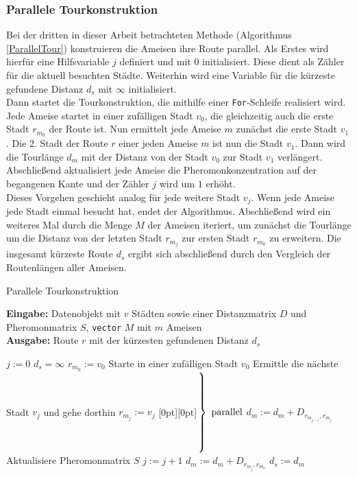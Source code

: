 \documentclass[doktyp=barbeit, sprache=german]{TUBAFarbeiten}
\begin{document}
\subsubsection{Parallele Tourkonstruktion}
Bei der dritten in dieser Arbeit betrachteten Methode (Algorithmus \ref{ParallelTour}) konstruieren die Ameisen ihre Route parallel.
Als Erstes wird hierfür eine Hilfsvariable $j$ definiert und mit $0$ initialisiert. Diese dient als Zähler für die aktuell besuchten Städte. Weiterhin wird eine Variable für die kürzeste gefundene Distanz $d_s$ mit $\infty$ initialisiert. \\Dann startet die Tourkonstruktion, die mithilfe einer \texttt{For}-Schleife realisiert wird. Jede Ameise startet in einer zufälligen Stadt $v_0$, die gleichzeitig auch die erste Stadt $r_{m_0}$ der Route ist. Nun ermittelt jede Ameise $m$ zunächst die erste Stadt $v_1$. Die 2. Stadt der Route $r$ einer jeden Ameise $m$ ist nun die Stadt $v_1$. Dann wird die Tourlänge $d_m$ mit der Distanz von der Stadt $v_0$ zur Stadt $v_1$ verlängert. Abschließend aktualisiert jede Ameise die Pheromonkonzentration auf der begangenen Kante und der Zähler $j$ wird um $1$ erhöht.
\\Dieses Vorgehen geschieht analog für jede weitere Stadt $v_j$. Wenn jede Ameise jede Stadt einmal besucht hat, endet der Algorithmus. Abschließend wird ein weiteres Mal durch die Menge $M$ der Ameisen iteriert, um zunächst die Tourlänge um die Distanz von der letzten Stadt $r_{m_j}$ zur ersten Stadt $r_{m_0}$ zu erweitern. Die insgesamt kürzeste Route $d_s$ ergibt sich abschließend durch den Vergleich der Routenlängen aller Ameisen.
\begin{algorithm}
\caption{Parallele Tourkonstruktion}
\label{ParallelTour}
\textbf{Eingabe:} Datenobjekt mit $v$ Städten sowie einer Distanzmatrix $D$ und Pheromonmatrix $S$, \texttt{vector} $M$ mit $m$ Ameisen
\\\textbf{Ausgabe:} Route $r$ mit der kürzesten gefundenen Distanz $d_s$
\begin{algorithmic}[1]
\State $j := 0$
\State $d_s = \infty$
\State $r_{m_0} := v_0$
\EndIf
\State Starte in einer zufälligen Stadt $v_0$
\State Ermittle die nächste Stadt $v_j$ und gehe dorthin
\State $r_{m_j} := v_j$
\hspace{17em}\raisebox{1.3\baselineskip}[0pt][0pt]{$\left.\rule{0pt}{3.8\baselineskip}\right\}\ \mbox{parallel}$}
\State $d_m := d_m + D_{r_{m_{j-1}},r_{m_j}}$
\State Aktualisiere Pheromonmatrix $S$
\EndFor
\State $j := j + 1$
\EndWhile
{} 
\State $d_m := d_m + D_{r_{m_j},r_{m_0}}$
\State $d_s := d_m$
\EndIf
\EndFor
\end{algorithmic}
\end{algorithm}
\end{document}
